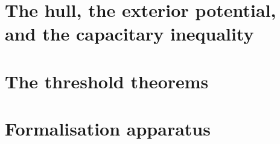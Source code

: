 \documentclass[11pt]{report}
\begin{document}
\part{The hull, the exterior potential, and the capacitary inequality}
\label{part:capacity}




\part{The threshold theorems}\label{part:threshold}








\part{Formalisation apparatus}




\end{document}
